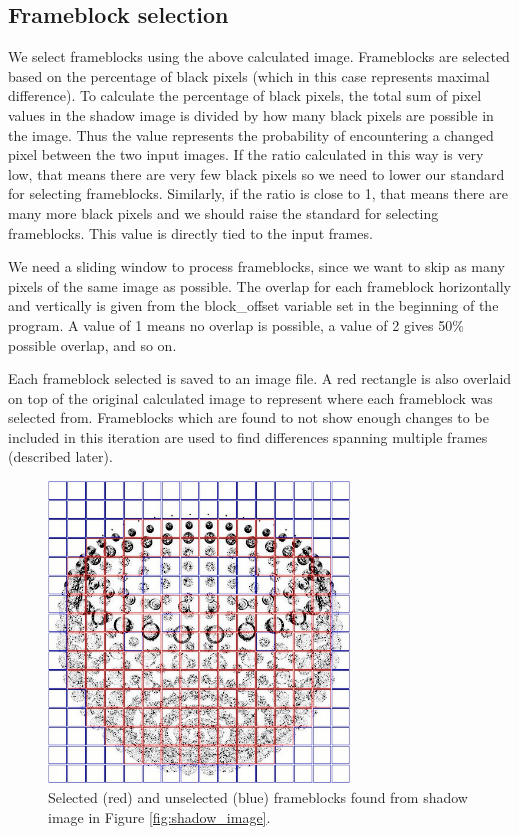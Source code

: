 \documentclass[conference]{IEEEtran}
\begin{document}
\subsection{Frameblock selection}
\label{subsec:frameblock_selection}
We select frameblocks using the above calculated image.
Frameblocks are selected based on the percentage of black pixels
(which in this case represents maximal difference).
To calculate the percentage of black pixels,
the total sum of pixel values in the shadow image is divided by how many black pixels are possible in the image.
Thus the value represents the probability of encountering a changed pixel between the two input images.
If the ratio calculated in this way is very low,
that means there are very few black pixels so we need to lower our standard for selecting frameblocks.
Similarly, if the ratio is close to 1,
that means there are many more black pixels and we should raise the standard for selecting frameblocks.
This value is directly tied to the input frames.

We need a sliding window to process frameblocks,
since we want to skip as many pixels of the same image as possible.
The overlap for each frameblock horizontally and vertically is given from the
block\_offset variable set in the beginning of the program.
A value of 1 means no overlap is possible,
a value of 2 gives 50\% possible overlap, and so on.

Each frameblock selected is saved to an image file.
A red rectangle is also overlaid on top of the original calculated image to represent where each frameblock was selected from.
Frameblocks which are found to not show enough changes to be included in this iteration are used to find differences spanning multiple frames (described later).

\begin{figure}[htbp]
\centerline{\includegraphics[width=8cm]{shadow_roi.png}}
\caption{Selected (red) and unselected (blue) frameblocks found from shadow
image in Figure \ref{fig:shadow_image}.}
\label{fig:shadow_roi}
\end{figure}
\end{document}
